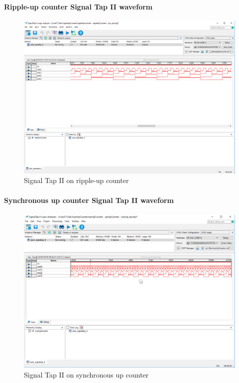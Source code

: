\documentclass{article}
\begin{document}
	\paragraph{Ripple-up counter Signal Tap II waveform}
	\begin{figure}[H]
	  \centering
	  \includegraphics[width=0.75\linewidth]{figures/stp/rippleUp_stp.png}
	  \caption{Signal Tap II on ripple-up counter}
	  \label{fig:rippleUp_stp}
	\end{figure}

	\paragraph{Synchronous up counter Signal Tap II waveform}
	\begin{figure}[H]
	  \centering
	  \includegraphics[width=0.75\linewidth]{figures/stp/synUp_stp.png}
	  \caption{Signal Tap II on synchronous up counter}
	  \label{fig:synUp_stp}
	\end{figure}
\end{document}
